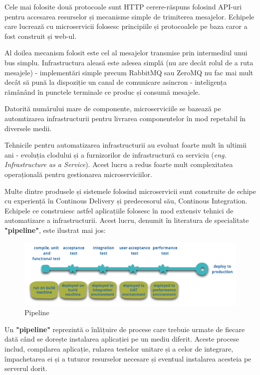 \documentclass[12pt, a4paper, oneside, romanian]{teza-upb}
\begin{document}
Cele mai folosite două protocoale sunt HTTP cerere-răspuns folosind API-uri pentru accesarea resurselor și mecanisme simple de trimiterea mesajelor. Echipele care lucrează cu microservicii folosesc principiile și protocoalele pe baza caror a fost construit și web-ul. 

Al doilea mecanism folosit este cel al mesajelor transmise prin intermediul unui bus simplu. Infrastructura aleasă este adesea simplă (nu are decât rolul de a ruta mesajele) - implementări simple precum RabbitMQ sau ZeroMQ nu fac mai mult decât să pună la dispoziție un canal de comunicare asincron - inteligența rămânând în punctele terminale ce produc și consumă mesajele.

Datorită numărului mare de componente, microserviciile se bazează pe automtizarea infrastructurii pentru livrarea componentelor în mod repetabil în diversele medii. 

Tehnicile pentru automatizarea infrastructurii au evoluat foarte mult în ultimii ani - evoluția clodului și a furnizorilor de infrastructură ca serviciu (\textit{eng. Infrastructure as a Service}). Acest lucru a redus foarte mult complexitatea operațională pentru gestionarea microserviciilor. 

Multe dintre produsele și sistemele folosind microservicii sunt construite de echipe cu experiență în Continous Delivery și predecesorul său, Continous Integration. Echipele ce construiesc astfel aplicațiile folosesc în mod extensiv tehnici de automatizare a infrastructurii. Acest lucru, denumit în literatura de specialitate \textbf{"pipeline"}, este ilustrat mai jos:

\begin{figure}[ht]
\centering
\includegraphics[scale=0.7]{img/basic-pipeline.png}
\caption{Pipeline}
\label{fig:arhi_componente}
\end{figure}

Un \textbf{"pipeline"} reprezintă o înlățuire de procese care trebuie urmate de fiecare dată când se dorește instalarea aplicației pe un mediu diferit. Aceste procese includ, compilarea aplicație, rularea testelor unitare și a celor de integrare, împachetarea ei și a tuturor resurselor necesare și eventual instalarea acesteia pe serverul dorit.
\end{document}
